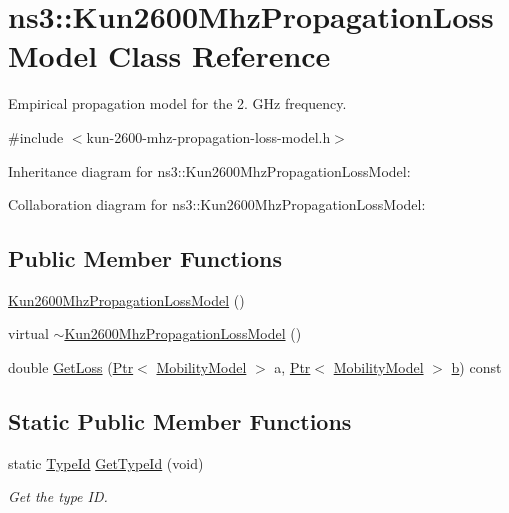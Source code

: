 \hypertarget{classns3_1_1Kun2600MhzPropagationLossModel}{}\section{ns3\+:\+:Kun2600\+Mhz\+Propagation\+Loss\+Model Class Reference}
\label{classns3_1_1Kun2600MhzPropagationLossModel}


Empirical propagation model for the 2. G\+Hz frequency.  




{\ttfamily \#include $<$kun-\/2600-\/mhz-\/propagation-\/loss-\/model.\+h$>$}



Inheritance diagram for ns3\+:\+:Kun2600\+Mhz\+Propagation\+Loss\+Model\+:


Collaboration diagram for ns3\+:\+:Kun2600\+Mhz\+Propagation\+Loss\+Model\+:
\subsection*{Public Member Functions}
\begin{DoxyCompactItemize}
\item 
\hyperlink{classns3_1_1Kun2600MhzPropagationLossModel_a2c1e9dd56170c0d03f7134af0a10db22}{Kun2600\+Mhz\+Propagation\+Loss\+Model} ()
\item 
virtual \hyperlink{classns3_1_1Kun2600MhzPropagationLossModel_a63244ec9e3c5489c5bc1370183286586}{$\sim$\+Kun2600\+Mhz\+Propagation\+Loss\+Model} ()
\item 
double \hyperlink{classns3_1_1Kun2600MhzPropagationLossModel_a6ca564e4f91bd979af59431ae2a9e0d8}{Get\+Loss} (\hyperlink{classns3_1_1Ptr}{Ptr}$<$ \hyperlink{classns3_1_1MobilityModel}{Mobility\+Model} $>$ a, \hyperlink{classns3_1_1Ptr}{Ptr}$<$ \hyperlink{classns3_1_1MobilityModel}{Mobility\+Model} $>$ \hyperlink{lte__pathloss_8m_a21ad0bd836b90d08f4cf640b4c298e7c}{b}) const 
\end{DoxyCompactItemize}
\subsection*{Static Public Member Functions}
\begin{DoxyCompactItemize}
\item 
static \hyperlink{classns3_1_1TypeId}{Type\+Id} \hyperlink{classns3_1_1Kun2600MhzPropagationLossModel_a2a89bebe4cb8fd45f68e3a0e62086b60}{Get\+Type\+Id} (void)
\begin{DoxyCompactList}\small\item\em Get the type ID. \end{DoxyCompactList}\end{DoxyCompactItemize}
